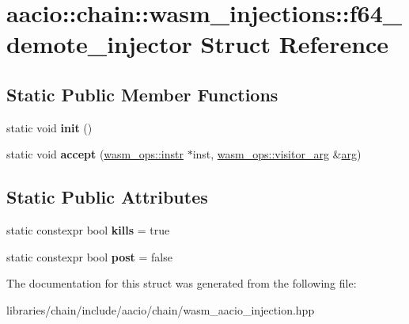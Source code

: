 \hypertarget{structaacio_1_1chain_1_1wasm__injections_1_1f64__demote__injector}{}\section{aacio\+:\+:chain\+:\+:wasm\+\_\+injections\+:\+:f64\+\_\+demote\+\_\+injector Struct Reference}
\label{structaacio_1_1chain_1_1wasm__injections_1_1f64__demote__injector}
\subsection*{Static Public Member Functions}
\begin{DoxyCompactItemize}
\item 
\mbox{\label{structaacio_1_1chain_1_1wasm__injections_1_1f64__demote__injector_adb0bd0ef6b59dadbf309374917e1fb24}} 
static void {\bfseries init} ()
\item 
\mbox{\label{structaacio_1_1chain_1_1wasm__injections_1_1f64__demote__injector_a14106572497b62999e3719463a9bcc24}} 
static void {\bfseries accept} (\mbox{\hyperlink{structaacio_1_1chain_1_1wasm__ops_1_1instr}{wasm\+\_\+ops\+::instr}} $\ast$inst, \mbox{\hyperlink{structaacio_1_1chain_1_1wasm__ops_1_1visitor__arg}{wasm\+\_\+ops\+::visitor\+\_\+arg}} \&\mbox{\hyperlink{unionarg}{arg}})
\end{DoxyCompactItemize}
\subsection*{Static Public Attributes}
\begin{DoxyCompactItemize}
\item 
\mbox{\label{structaacio_1_1chain_1_1wasm__injections_1_1f64__demote__injector_acd1e3f2d976677fbe84e1178d06aea57}} 
static constexpr bool {\bfseries kills} = true
\item 
\mbox{\label{structaacio_1_1chain_1_1wasm__injections_1_1f64__demote__injector_a7e876ece4ff1ff6c0d6a4236a62683e6}} 
static constexpr bool {\bfseries post} = false
\end{DoxyCompactItemize}


The documentation for this struct was generated from the following file\+:\begin{DoxyCompactItemize}
\item 
libraries/chain/include/aacio/chain/wasm\+\_\+aacio\+\_\+injection.\+hpp\end{DoxyCompactItemize}
